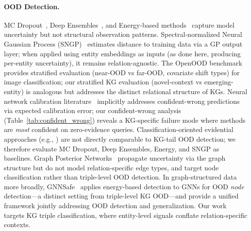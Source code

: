 \paragraph{OOD Detection.}
MC Dropout~\citep{gal2016dropout}, Deep Ensembles~\citep{lakshminarayanan2017simple}, and Energy-based methods~\citep{liu2020energy} capture model uncertainty but not structural observation patterns.
Spectral-normalized Neural Gaussian Process (SNGP)~\citep{liu2020simple} estimates distance to training data via a GP output layer; when applied using entity embeddings as inputs (as done here, producing per-entity uncertainty), it remains relation-agnostic.
The OpenOOD benchmark~\citep{zhang2023openood} provides stratified evaluation (near-OOD vs far-OOD, covariate shift types) for image classification; our stratified KG evaluation (novel-context vs emerging-entity) is analogous but addresses the distinct relational structure of KGs.
Neural network calibration literature~\citep{guo2017calibration} implicitly addresses confident-wrong predictions via expected calibration error; our confident-wrong analysis (Table~\ref{tab:confident_wrong}) reveals a KG-specific failure mode where methods are \emph{most} confident on zero-evidence queries.
Classification-oriented evidential approaches (e.g., \citep{sensoy2018evidential}) are not directly comparable to KG-tail OOD detection; we therefore evaluate MC Dropout, Deep Ensembles, Energy, and SNGP as baselines.
Graph Posterior Networks~\citep{stadler2021graph} propagate uncertainty via the graph structure but do not model relation-specific edge types, and target node classification rather than triple-level OOD detection.
In graph-structured data more broadly, GNNSafe~\citep{wu2023energy} applies energy-based detection to GNNs for OOD \emph{node} detection---a distinct setting from triple-level KG OOD---and \citet{wang2024bridging} provide a unified framework jointly addressing OOD detection and generalization. Our work targets KG triple classification, where entity-level signals conflate relation-specific contexts.


